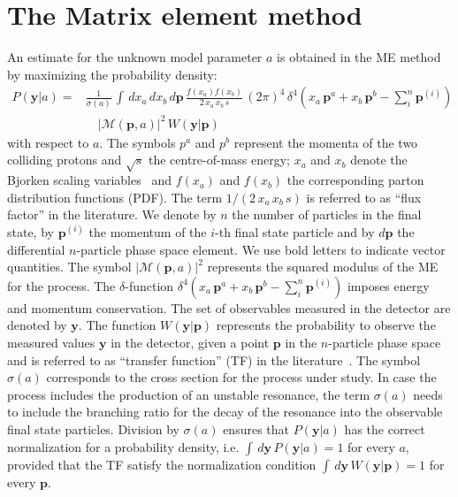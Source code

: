 \section{The Matrix element method}
\label{sec:mem}

An estimate for the unknown model parameter $a$
is obtained in the ME method by maximizing the probability density:
\begin{align}
P(\bm{y}|a) = & \frac{1}{\sigma(a)} \, \int \, dx_{a} \, dx_{b} \,
d\bm{p} \, \frac{f(x_{a}) f(x_{b})}{2 \, x_{a} \, x_{b} \, s} \, (2\pi)^{4} \,
\delta^{4}( x_{a} \, \bm{p}^{a} + x_{b} \, \bm{p}^{b} - \sum_{i}^{n} \bm{p}^{(i)}) \, \nonumber \\
  & \quad \vert \mathcal{M}(\bm{p},a) \vert^{2} \, W(\bm{y}|\bm{p}) 
\label{eq:mem}
\end{align}
with respect to $a$.
The symbols $p^{a}$ and $p^{b}$ represent the momenta of the two colliding
protons and $\sqrt{s}$ the centre-of-mass energy;
$x_{a}$ and $x_{b}$ denote the Bjorken scaling variables~\cite{Bjorkenx}
and $f(x_{a})$ and $f(x_{b})$ the corresponding parton distribution
functions (PDF).
The term $1/(2 \, x_{a} \, x_{b} \, s)$ is referred to as ``flux factor'' in the literature.
We denote by $n$ the number of particles in the final state,
by $\bm{p}^{(i)}$ the momentum of the $i$-th final state particle
and by $d\bm{p}$ the differential $n$-particle
phase space element.
We use bold letters to indicate vector quantities.
The symbol $\vert \mathcal{M}(\bm{p},a) \vert^{2}$ represents the
squared modulus of the ME for
the process.
The $\delta$-function $\delta^{4}( x_{a} \, \bm{p}^{a} + x_{b} \,
\bm{p}^{b} - \sum_{i}^{n} \bm{p}^{(i)})$ imposes energy and momentum
conservation.
The set of observables measured in the
detector are denoted by $\bm{y}$.
The function $W(\bm{y}|\bm{p})$ represents the probability to
observe the measured values $\bm{y}$ in the detector, given a point $\bm{p}$ in the
$n$-particle phase space and
is referred to as ``transfer function'' (TF) in the
literature~\cite{Fiedler:2010sg,Volobouev:2011vb}.
The symbol $\sigma(a)$ corresponds to the cross section for the process under study.
In case the process includes the production of an unstable resonance,
the term $\sigma(a)$ needs to include 
the branching ratio for the decay of the resonance into the observable final state particles.
Division by $\sigma(a)$ ensures that $P(\bm{y}|a)$ has
the correct normalization for a probability density, 
i.e. $\int \, d\bm{y} \, P(\bm{y}|a) = 1$ for every $a$, 
provided that the TF satisfy the normalization condition
$\int \, d\bm{y}\, W(\bm{y}|\bm{p}) = 1$
for every $\bm{p}$.

